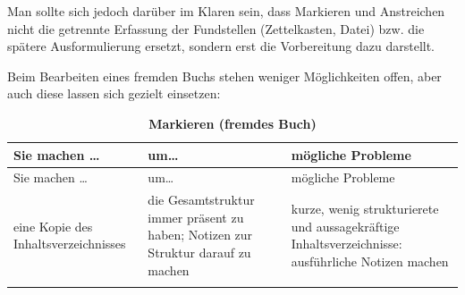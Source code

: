 \documentclass[]{book}
\theoremstyle{definition}
\theoremstyle{definition}
\theoremstyle{definition}
\theoremstyle{remark}
\begin{document}
Man sollte sich jedoch darüber im Klaren sein, dass Markieren und
Anstreichen nicht die getrennte Erfassung der Fundstellen (Zettelkasten,
Datei) bzw. die spätere Ausformulierung ersetzt, sondern erst die
Vorbereitung dazu darstellt.

Beim Bearbeiten eines fremden Buchs stehen weniger Möglichkeiten offen,
aber auch diese lassen sich gezielt einsetzen:

\begin{longtable}[]{@{}lll@{}}
\caption{\textbf{\label{tab:markieren-fremdes-buch} Markieren (fremdes
Buch)}}\tabularnewline
\toprule
\begin{minipage}[b]{0.31\columnwidth}\raggedright\strut
Sie machen \ldots{}\strut
\end{minipage} & \begin{minipage}[b]{0.27\columnwidth}\raggedright\strut
um\ldots{}\strut
\end{minipage} & \begin{minipage}[b]{0.33\columnwidth}\raggedright\strut
mögliche Probleme\strut
\end{minipage}\tabularnewline
\midrule
\endfirsthead
\toprule
\begin{minipage}[b]{0.31\columnwidth}\raggedright\strut
Sie machen \ldots{}\strut
\end{minipage} & \begin{minipage}[b]{0.27\columnwidth}\raggedright\strut
um\ldots{}\strut
\end{minipage} & \begin{minipage}[b]{0.33\columnwidth}\raggedright\strut
mögliche Probleme\strut
\end{minipage}\tabularnewline
\midrule
\endhead
\begin{minipage}[t]{0.31\columnwidth}\raggedright\strut
eine Kopie des Inhaltsverzeichnisses\strut
\end{minipage} & \begin{minipage}[t]{0.27\columnwidth}\raggedright\strut
die Gesamtstruktur immer präsent zu haben; Notizen zur Struktur darauf
zu machen \vspace{5mm}\strut
\end{minipage} & \begin{minipage}[t]{0.33\columnwidth}\raggedright\strut
kurze, wenig strukturierete und aussagekräftige Inhaltsverzeichnisse:
ausführliche Notizen machen \vspace{5mm}\strut
\end{minipage}\tabularnewline
\begin{minipage}[t]{0.31\columnwidth}\raggedright\strut

\end{minipage}
\end{longtable}
\end{document}
